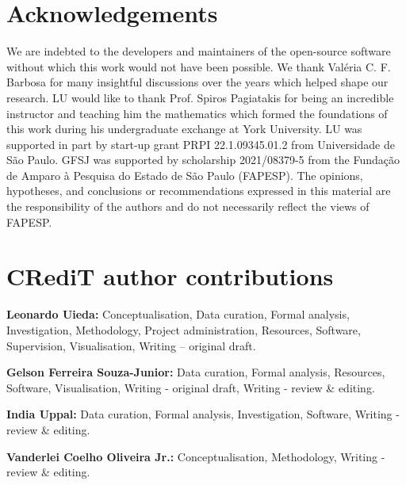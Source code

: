 \section*{Acknowledgements}


We are indebted to the developers and maintainers of the open-source software
without which this work would not have been possible.
We thank Valéria C. F. Barbosa for many insightful discussions over the years which helped shape our research.
LU would like to thank Prof. Spiros Pagiatakis for being an incredible instructor and teaching him the mathematics which formed the foundations of this work during his undergraduate exchange at York University.
LU was supported in part by start-up grant PRPI 22.1.09345.01.2 from Universidade de São Paulo.
GFSJ was supported by scholarship 2021/08379-5 from the Fundação de Amparo à Pesquisa do Estado de São Paulo (FAPESP).
The opinions, hypotheses, and conclusions or recommendations expressed in this material are the responsibility of the authors and do not necessarily reflect the views of FAPESP.

\section*{CRediT author contributions}

\textbf{Leonardo Uieda:} Conceptualisation, Data curation, Formal analysis, Investigation, Methodology, Pro\-ject administration, Resources, Software, Supervision, Visualisation, Writing – original draft.

\noindent
\textbf{Gelson Ferreira Souza-Junior:} Data curation, Formal analysis, Resources, Software, Visualisation, Writing - original draft, Writing - review \& editing.

\noindent
\textbf{India Uppal:} Data curation, Formal analysis, Investigation, Software, Writing - review \& editing.

\noindent
\textbf{Vanderlei Coelho Oliveira Jr.:} Conceptualisation, Methodology, Writing - review \& editing.
